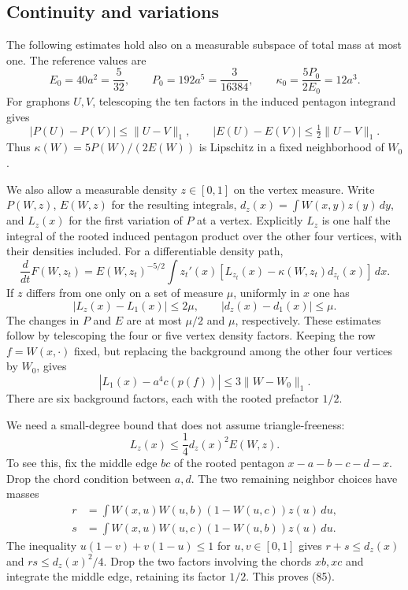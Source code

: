 \subsection{Continuity and variations}

The following estimates hold also on a measurable subspace of total
mass at most one. The reference values are
\[
 E_0=40a^2=\frac5{32},\qquad
 P_0=192a^5=\frac3{16384},\qquad
 \kappa_0=\frac{5P_0}{2E_0}=12a^3.
\]
For graphons $U,V$, telescoping the ten factors in the induced
pentagon integrand gives
\begin{equation}\tag{81}\label{eq:l1-continuity}
 |P(U)-P(V)|\leq\lVert U-V\rVert_1,\qquad
 |E(U)-E(V)|\leq\tfrac12\lVert U-V\rVert_1.
\end{equation}
Thus $\kappa(W)=5P(W)/(2E(W))$ is Lipschitz in a fixed neighborhood
of $W_0$.

We also allow a measurable density $z\in[0,1]$ on the vertex measure.
Write $P(W,z)$, $E(W,z)$ for the resulting integrals,
$d_z(x)=\int W(x,y)z(y)\,dy$, and $L_z(x)$ for the first variation
of $P$ at a vertex. Explicitly $L_z$ is one half the integral of the
rooted induced pentagon product over the other four vertices, with
their densities included. For a differentiable density path,
\begin{equation}\tag{82}\label{eq:vertex-density-variation}
 \frac{d}{dt}F(W,z_t)
 =E(W,z_t)^{-5/2}\int z_t'(x)
       [L_{z_t}(x)-\kappa(W,z_t)d_{z_t}(x)]\,dx.
\end{equation}
If $z$ differs from one only on a set of measure $\mu$, uniformly in
$x$ one has
\begin{equation}\tag{83}\label{eq:density-deletion-errors}
 |L_z(x)-L_1(x)|\leq2\mu,\qquad
 |d_z(x)-d_1(x)|\leq\mu.
\end{equation}
The changes in $P$ and $E$ are at most $\mu/2$ and $\mu$,
respectively. These estimates follow by telescoping the four or five
vertex density factors. Keeping the row $f=W(x,\cdot)$ fixed, but
replacing the background among the other four vertices by $W_0$, gives
\begin{equation}\tag{84}\label{eq:background-replacement-error}
 |L_1(x)-a^4c(p(f))|\leq3\lVert W-W_0\rVert_1.
\end{equation}
There are six background factors, each with the rooted prefactor $1/2$.

We need a small-degree bound that does not assume triangle-freeness:
\begin{equation}\tag{85}\label{eq:local-small-degree-link}
 L_z(x)\leq\frac14d_z(x)^2E(W,z).
\end{equation}
To see this, fix the middle edge $bc$ of the rooted pentagon
$x-a-b-c-d-x$. Drop the chord condition between $a,d$. The two
remaining neighbor choices have masses
\begin{align*}
 r&=\int W(x,u)W(u,b)(1-W(u,c))z(u)\,du,\\
 s&=\int W(x,u)W(u,c)(1-W(u,b))z(u)\,du.
\end{align*}
The inequality $u(1-v)+v(1-u)\leq1$ for $u,v\in[0,1]$ gives
$r+s\leq d_z(x)$ and $rs\leq d_z(x)^2/4$. Drop the two factors
involving the chords $xb,xc$ and integrate the middle edge, retaining
its factor $1/2$. This proves (85).


